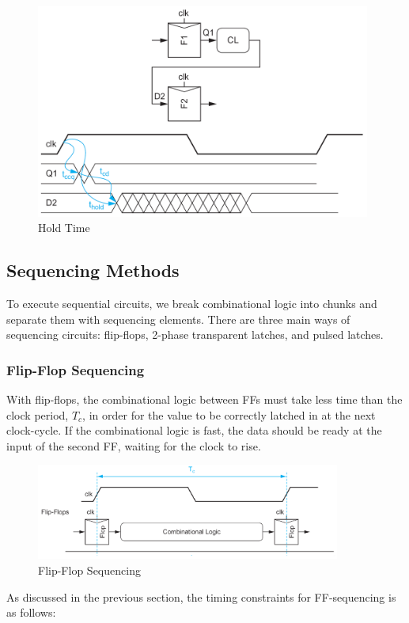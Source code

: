 \documentclass{article}
\begin{document}
\begin{figure}[ht!]
\centering
\includegraphics[width=110mm]{HoldTime.png}
\caption{Hold Time}
\end{figure}

\subsection{Sequencing Methods}

To execute sequential circuits, we break combinational logic into chunks and separate them with sequencing elements. There are three main ways of sequencing circuits: flip-flops, 2-phase transparent latches, and pulsed latches. 

\subsubsection{Flip-Flop Sequencing}

With flip-flops, the combinational logic between FFs must take less time than the clock period, $T_c$, in order for the value to be correctly latched in at the next clock-cycle. If the combinational logic is fast, the data should be ready at the input of the second FF, waiting for the clock to rise.

\begin{figure}[ht!]
\centering
\includegraphics[width=100mm]{Seq1.png}
\caption{Flip-Flop Sequencing}
\end{figure}

As discussed in the previous section, the timing constraints for FF-sequencing is as follows:
\end{document}
